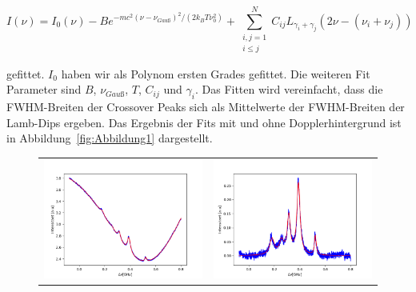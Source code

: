 \documentclass[a4paper,parskip]{scrartcl}
\begin{document}
 \begin{equation}
I(\nu) = I_0(\nu)-B e^{-mc^2(\nu-\nu_{Gauß})^2/(2k_BT\nu_0^2)} +\sum_{\substack{i,j=1\\i\leq j}}^N C_{ij} L_{\gamma_i+\gamma_j}(2\nu-(\nu_i+\nu_j))
\label{SaettigungsFit2}
\end{equation}

gefittet. $I_0$ haben wir als Polynom ersten Grades gefittet. Die weiteren Fit Parameter sind $B$, $\nu_{Gauß}$, $T$, $C_{ij}$ und $\gamma_i$. Das Fitten wird vereinfacht, dass die FWHM-Breiten der Crossover Peaks sich als Mittelwerte der FWHM-Breiten der Lamb-Dips ergeben. Das Ergebnis der Fits mit und ohne Dopplerhintergrund ist in Abbildung~\ref{fig:Abbildung1} dargestellt.

\begin{figure}[p]
\centering
\begin{tabular}{cc}
    \includegraphics[scale = 0.45]{./saturation/peak1/fit.png}  &  \includegraphics[scale = 0.45]{./saturation/peak1/gaussCorrected.png}  \\

\end{tabular}
\end{figure}
\end{document}
